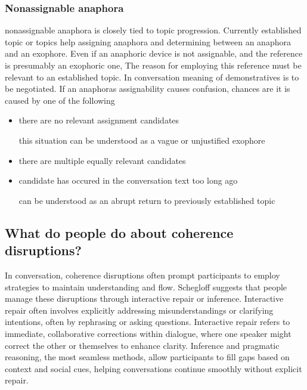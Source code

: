 \documentclass[12pt]{report}
\begin{document}
{\subsubsection{Nonassignable anaphora}
\par
    nonassignable anaphora is closely tied to topic progression.
    Currently established topic or topics help assigning anaphora and
    determining between an anaphora and an exophore.
    Even if an anaphoric device is not assignable,
    and the reference is presumably an exophoric one,
    The reason for employing this reference must be
    relevant to an established topic.
    In conversation meaning of demonstratives is to be negotiated.
    If an anaphoras assignability causes confusion,
    chances are it is caused by one of the following

\begin{itemize}
\item
there are no relevant assignment candidates

    \quad
    this situation can be understood as a vague or unjustified exophore

\item
there are multiple equally relevant candidates

\item
candidate has occured in the conversation text too long ago

    \quad
    can be understood as an abrupt return to previously established topic
\end{itemize}

\subsection{What do people do about coherence disruptions?}
\par
In conversation, coherence disruptions often prompt participants to
employ strategies to maintain understanding and flow.
Schegloff suggests that people manage these disruptions through interactive repair or inference.
Interactive repair often involves
explicitly addressing misunderstandings or clarifying intentions,
often by rephrasing or asking questions.
Interactive repair refers to immediate, collaborative corrections within dialogue,
where one speaker might correct the other or themselves to enhance clarity.
Inference and pragmatic reasoning, the most seamless methods,
allow participants to fill gaps based on context and social cues,
helping conversations continue smoothly without explicit repair.

}
\end{document}
